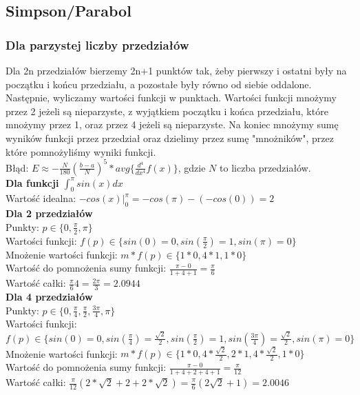 \documentclass{article}
\begin{document}
\subsection{Simpson/Parabol}
\subsubsection{Dla parzystej liczby przedziałów}
Dla 2n przedziałów bierzemy 2n+1 punktów tak, żeby pierwszy i ostatni były na początku i końcu przedziału, a pozostałe były równo od siebie oddalone. Następnie, wyliczamy wartości funkcji w punktach. Wartości funkcji mnożymy przez 2 jeżeli są nieparzyste, z wyjątkiem początku i końca przedziału, które mnożymy przez 1, oraz przez 4 jeżeli są nieparzyste. Na koniec mnożymy sumę wyników funkcji przez przedział oraz dzielimy przez sumę "mnożników", przez które pomnożyliśmy wyniki funkcji.\\
Błąd: $E\approx-\frac{N}{180}(\frac{b-a}{N})^5*avg\{\frac{d^4}{dx^4}f(x)\}$, gdzie $N$ to liczba przedziałów.\\
\textbf{Dla funkcji $\int_{0}^{\pi}sin(x)dx$}\\
Wartość idealna: $-cos(x)|^\pi_0=-cos(\pi)-(-cos(0))=2$\\
\textbf{Dla 2 przedziałów}\\
Punkty: $p \in \{0, \frac{\pi}{2}, \pi\}$\\
Wartości funkcji: $f(p) \in \{sin(0)=0, sin(\frac{\pi}{2})=1, sin(\pi)=0\}$\\
Mnożenie wartości funkcji: $m*f(p) \in \{1*0, 4*1, 1*0\}$\\
Wartość do pomnożenia sumy funkcji: $\frac{\pi-0}{1+4+1}=\frac{\pi}{6}$\\
Wartość całki: $\frac{\pi}{6}4=\frac{2\pi}{3}=2.0944$\\
\textbf{Dla 4 przedziałów}\\
Punkty: $p \in \{0, \frac{\pi}{4}, \frac{\pi}{2}, \frac{3\pi}{4}, \pi\}$\\
Wartości funkcji: $f(p) \in \{sin(0)=0, sin(\frac{\pi}{4})=\frac{\sqrt{2}}{2}, sin(\frac{\pi}{2})=1, sin(\frac{3\pi}{4})=\frac{\sqrt{2}}{2}, sin(\pi)=0\}$\\
Mnożenie wartości funkcji: $m*f(p) \in \{1*0, 4*\frac{\sqrt{2}}{2}, 2*1, 4*\frac{\sqrt{2}}{2}, 1*0\}$\\
Wartość do pomnożenia sumy funkcji: $\frac{\pi-0}{1+4+2+4+1}=\frac{\pi}{12}$\\
Wartość całki: $\frac{\pi}{12}(2*\sqrt{2}+2+2*\sqrt{2})=\frac{\pi}{6}(2\sqrt{2}+1)=2.0046$\\
\end{document}
